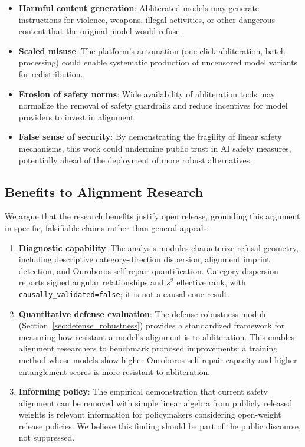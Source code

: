 \documentclass[11pt]{article}
\begin{document}
\begin{itemize}[leftmargin=*]
    \item \textbf{Harmful content generation}: Abliterated models may generate instructions for violence, weapons, illegal activities, or other dangerous content that the original model would refuse.
    \item \textbf{Scaled misuse}: The platform's automation (one-click abliteration, batch processing) could enable systematic production of uncensored model variants for redistribution.
    \item \textbf{Erosion of safety norms}: Wide availability of abliteration tools may normalize the removal of safety guardrails and reduce incentives for model providers to invest in alignment.
    \item \textbf{False sense of security}: By demonstrating the fragility of linear safety mechanisms, this work could undermine public trust in AI safety measures, potentially ahead of the deployment of more robust alternatives.
\end{itemize}

\subsection{Benefits to Alignment Research}

We argue that the research benefits justify open release, grounding this argument in specific, falsifiable claims rather than general appeals:

\begin{enumerate}[leftmargin=*]
    \item \textbf{Diagnostic capability}: The analysis modules characterize refusal geometry, including descriptive category-direction dispersion, alignment imprint detection, and Ouroboros self-repair quantification. Category dispersion reports signed angular relationships and $s^2$ effective rank, with \texttt{causally\_validated=false}; it is not a causal cone result.

    \item \textbf{Quantitative defense evaluation}: The defense robustness module (Section~\ref{sec:defense_robustness}) provides a standardized framework for measuring how resistant a model's alignment is to abliteration. This enables alignment researchers to benchmark proposed improvements: a training method whose models show higher Ouroboros self-repair capacity and higher entanglement scores is more resistant to abliteration.

    \item \textbf{Informing policy}: The empirical demonstration that current safety alignment can be removed with simple linear algebra from publicly released weights is relevant information for policymakers considering open-weight release policies. We believe this finding should be part of the public discourse, not suppressed.
\end{enumerate}
\end{document}
